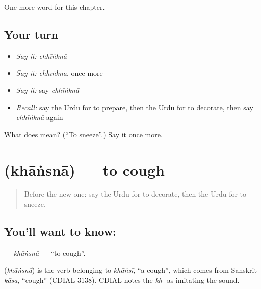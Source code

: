 \begin{grammarlens}[title={What you've built}]
One more word for this chapter.
\end{grammarlens}

\subsection*{Your turn}
\begin{itemize}
\raggedright
  \item \emph{Say it:} \emph{chhīṅknā}
  \item \emph{Say it:} \emph{chhīṅknā}, once more
  \item \emph{Say it:} say \emph{chhīṅknā}
  \item \emph{Recall:} say the Urdu for to prepare, then the Urdu for to decorate, then say \emph{chhīṅknā} again
\end{itemize}

\begin{tcolorbox}[breakable,colback=teal!4,colframe=teal!35!black,title={Before you move on}]
What does  mean? (\textquotedblleft{}To sneeze\textquotedblright{}.) Say it once more.
\end{tcolorbox}
\section[\texorpdfstring{\ur{کھانسنا} (khāṅsnā)}{کھانسنا (khāṅsnā)}]{ (khāṅsnā) — to cough}

\label{lesson:UR-C151-khansna}



\begin{quote}
Before the new one: say the Urdu for to decorate, then the Urdu for to sneeze.
\end{quote}

\subsection*{You'll want to know: }
\textbf{} — \emph{khāṅsnā} — \textquotedblleft{}to cough\textquotedblright{}.

\begin{cousinweb}
\textbf{} (\emph{khāṅsnā}) is the verb belonging to \emph{khāṅsī}, \textquotedblleft{}a cough\textquotedblright{}, which comes from Sanskrit \emph{kāsa}, \textquotedblleft{}cough\textquotedblright{} (CDIAL 3138). CDIAL notes the \emph{kh-} as imitating the sound.
\end{cousinweb}

